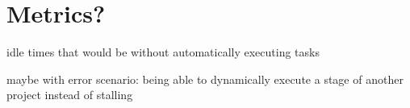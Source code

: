 \chapter{Metrics?}

idle times that would be without automatically executing tasks

maybe with error scenario: being able to dynamically execute a stage of another project instead of stalling